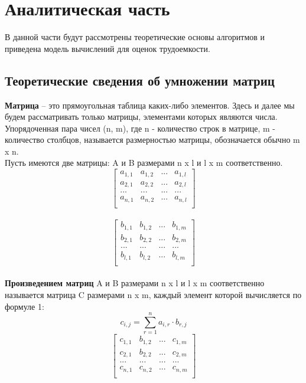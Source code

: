\documentclass[a4paper, 14pt]{article}
\begin{document}
        \label{sec:intro}

    	\newpage
        \section{Аналитическая часть}
		\parindent=1cm
		
		В данной части будут рассмотрены теоретические основы алгоритмов и приведена модель вычислений для оценок трудоемкости.
		

        \subsection{Теоретические сведения об умножении матриц}
        
		\textbf{Матрица} – это прямоугольная таблица каких-либо элементов. Здесь и далее мы будем рассматривать только матрицы, элементами которых являются числа. Упорядоченная пара чисел (n, m), где n - количество строк в матрице, m - количество столбцов, называется размерностью матрицы, обозначается обычно m x n.\\
		Пусть имеются две матрицы: A и B размерами n x l и l x m соответственно.\\
		\[ \begin{bmatrix}
		a_{1,1} & a_{1,2} & ... & a_{1,l} \\
		a_{2,1} & a_{2,2} & ... & a_{2,l}\\		
		... & ... & ... & ... \\
		a_{n,1} & a_{n, 2} & ... & a_{n,l} \\
		\end{bmatrix} \]\\
				\[ \begin{bmatrix}
		b_{1,1} & b_{1,2} & ... & b_{1,m} \\
		b_{2,1} & b_{2,2} & ... & b_{2,m}\\		
		... & ... & ... & ... \\
		b_{l,1} & b_{l, 2} & ... & b_{l,m} \\
		\end{bmatrix} \]\\
		
		
		\textbf{Произведением матриц} A и B размерами n x l и l x m соответственно называется матрица C размерами n x m, каждый элемент которой вычисляется по формуле 1:\\
		\begin{equation}
		c_{i,j} = \sum\limits_{r=1}^n a_{i,r}\cdot b_{r,j}
		\end{equation}		
		\[ \begin{bmatrix}
		c_{1,1} & b_{1,2} & ... & c_{1,m} \\
		c_{2,1} & b_{2,2} & ... & c_{2,m}\\		
		... & ... & ... & ... \\
		c_{n,1} & c_{n, 2} & ... & c_{n,m} \\
		\end{bmatrix} \]\\
		
\end{document}
